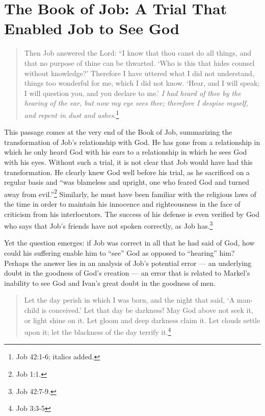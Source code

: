 \section{The Book of Job: A Trial That Enabled Job to See God}
\begin{quote}
\singlespacing
Then Job answered the Lord: ``I know that thou canst do all things, and that no purpose of thine can be thwarted. `Who is this that hides counsel without knowledge?' Therefore I have uttered what I did not understand, things too wonderful for me, which I did not know. `Hear, and I will speak; I will question you, and you declare to me.' \emph{I had heard of thee by the hearing of the ear, but now my eye sees thee; therefore I despise myself, and repent in dust and ashes}.\footnote{Job 42:1-6; italics added.} 
\end{quote}

This passage comes at the very end of the Book of Job, summarizing the transformation of Job's relationship with God. He has gone from a relationship in which he only heard God with his ears to a relationship in which he sees God with his eyes. Without such a trial, it is not clear that Job would have had this transformation. He clearly knew God well before his trial, as he sacrificed on a regular basis and ``was blameless and upright, one who feared God and turned away from evil.''\footnote{Job 1:1.} Similarly, he must have been familiar with the religious laws of the time in order to maintain his innocence and righteousness in the face of criticism from his interlocutors. The success of his defense is even verified by God who says that Job's friends have not spoken correctly, as Job has.\footnote{Job 42:7-9.}

Yet the question emerges: if Job was correct in all that he had said of God, how could his suffering enable him to ``see'' God as opposed to ``hearing'' him? Perhaps the answer lies in an analysis of Job's potential error --- an underlying doubt in the goodness of God's creation --- an error that is related to Markel's inability to see God and Ivan's great doubt in the goodness of men.

\begin{quote}
\singlespacing
Let the day perish in which I was born, and the night that said, `A man-child is conceived.' Let that day be darkness! May God above not seek it, or light shine on it. Let gloom and deep darkness claim it. Let clouds settle upon it; let the blackness of the day terrify it.\footnote{Job 3:3-5}
\end{quote} 

